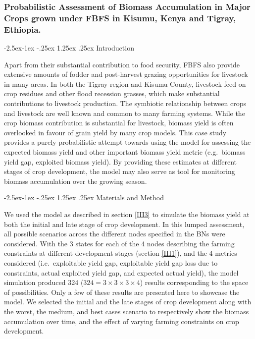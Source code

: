 \documentclass[12pt,oneside]{article}
\makeatletter
\renewcommand\paragraph{\@startsection{paragraph}{4}{\z@}%
            {-2.5ex\@plus -1ex \@minus -.25ex}%
            {1.25ex \@plus .25ex}%
            {\normalfont\normalsize\bfseries}}
\makeatother
\begin{document}
\hypertarget{IV22}{%
\subsubsection{Probabilistic Assessment of Biomass Accumulation in Major Crops grown under FBFS in Kisumu, Kenya and Tigray, Ethiopia.}\label{IV22}}

\hypertarget{IV221}{%
\paragraph{Introduction}\label{IV221}}

Apart from their substantial contribution to food security, FBFS also provide extensive amounts of fodder and post-harvest grazing opportunities for livestock in many areas. In both the Tigray region and Kisumu County, livestock feed on crop residues and other flood recession grasses, which make substantial contributions to livestock production. The symbiotic relationship between crops and livestock are well known and common to many farming systems. While the crop biomass contribution is substantial for livestock, biomass yield is often overlooked in favour of grain yield by many crop models. This case study provides a purely probabilistic attempt towards using the model for assessing the expected biomass yield and other important biomass yield metric (e.g.~biomass yield gap, exploited biomass yield). By providing these estimates at different stages of crop development, the model may also serve as tool for monitoring biomass accumulation over the growing season.

\hypertarget{IV222}{%
\paragraph{Materials and Method}\label{IV222}}

We used the model as described in section \ref{III3} to simulate the biomass yield at both the initial and late stage of crop development. In this lumped assessment, all possible scenarios across the different nodes specified in the BNs were considered. With the 3 states for each of the 4 nodes describing the farming constraints at different development stages (section \ref{III1}), and the 4 metrics considered (i.e.~exploitable yield gap, exploitable yield gap loss due to constraints, actual exploited yield gap, and expected actual yield), the model simulation produced 324 (\(324 = 3\times3\times3\times4\)) results corresponding to the space of possibilities. Only a few of these results are presented here to showcase the model. We selected the initial and the late stages of crop development along with the worst, the medium, and best cases scenario to respectively show the biomass accumulation over time, and the effect of varying farming constraints on crop development.
\end{document}
